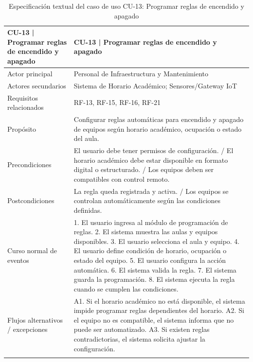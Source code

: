 \begingroup
\small
\begin{longtable}{|P{0.5000}|P{0.5000}|}
\hline
CU-13 | Programar reglas de encendido y apagado & CU-13 | Programar reglas de encendido y apagado \\ \hline
Actor principal & Personal de Infraestructura y Mantenimiento \\ \hline
Actores secundarios & Sistema de Horario Académico; Sensores/Gateway IoT \\ \hline
Requisitos relacionados & RF-13, RF-15, RF-16, RF-21 \\ \hline
Propósito & Configurar reglas automáticas para encendido y apagado de equipos según horario académico, ocupación o estado del aula. \\ \hline
Precondiciones & El usuario debe tener permisos de configuración. / El horario académico debe estar disponible en formato digital o estructurado. / Los equipos deben ser compatibles con control remoto. \\ \hline
Postcondiciones & La regla queda registrada y activa. / Los equipos se controlan automáticamente según las condiciones definidas. \\ \hline
Curso normal de eventos & 1. El usuario ingresa al módulo de programación de reglas. 2. El sistema muestra las aulas y equipos disponibles. 3. El usuario selecciona el aula y equipo. 4. El usuario define condición de horario, ocupación o estado del equipo. 5. El usuario configura la acción automática. 6. El sistema valida la regla. 7. El sistema guarda la programación. 8. El sistema ejecuta la regla cuando se cumplen las condiciones. \\ \hline
Flujos alternativos / excepciones & A1. Si el horario académico no está disponible, el sistema impide programar reglas dependientes del horario. A2. Si el equipo no es compatible, el sistema informa que no puede ser automatizado. A3. Si existen reglas contradictorias, el sistema solicita ajustar la configuración. \\ \hline
\caption{Especificación textual del caso de uso CU-13: Programar reglas de encendido y apagado}
\end{longtable}
\endgroup

